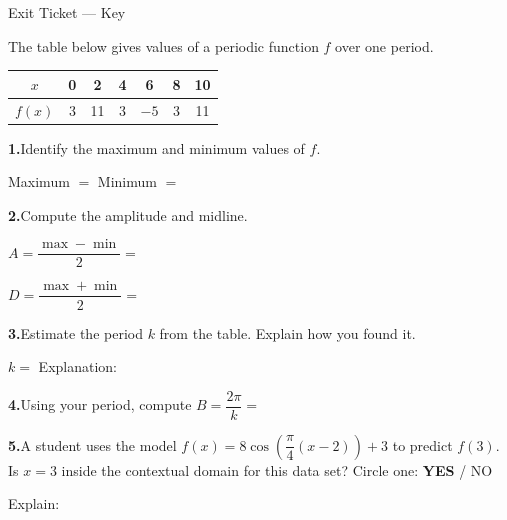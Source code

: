 \documentclass[10pt]{article}
\begin{document}
\namedateperiod

\vspace{0.12in}

\begin{notesbox}{Exit Ticket --- Key}

The table below gives values of a periodic function $f$ over one period.

\vspace{6pt}
\begin{center}
\renewcommand{\arraystretch}{1.4}
\begin{tabular}{|c|c|c|c|c|c|c|}
\hline
$x$ & 0 & 2 & 4 & 6 & 8 & 10 \\
\hline
$f(x)$ & 3 & 11 & 3 & $-5$ & 3 & 11 \\
\hline
\end{tabular}
\end{center}

\vspace{8pt}
\textbf{1.}\quad Identify the maximum and minimum values of $f$.

Maximum $= $  \qquad Minimum $= $ 

\vspace{8pt}
\textbf{2.}\quad Compute the amplitude and midline.

$A = \dfrac{\max - \min}{2} = $ 

\vspace{4pt}
$D = \dfrac{\max + \min}{2} = $ 

\vspace{8pt}
\textbf{3.}\quad Estimate the period $k$ from the table. Explain how you found it.

$k = $  \quad Explanation: 

\vspace{8pt}
\textbf{4.}\quad Using your period, compute $B = \dfrac{2\pi}{k} = $ 

\vspace{8pt}
\textbf{5.}\quad A student uses the model $f(x) = 8\cos\!\left(\dfrac{\pi}{4}(x - 2)\right) + 3$
to predict $f(3)$. Is $x = 3$ inside the contextual domain for this data set?
Circle one: \quad \textbf{\color{keyred}YES} \quad / \quad NO

\vspace{4pt}
Explain: 

\end{notesbox}
\end{document}
